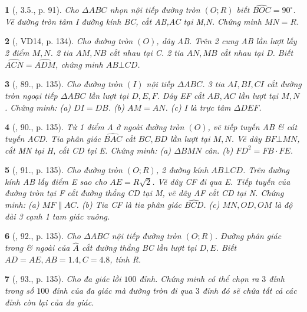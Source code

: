 \documentclass{article}
\newtheorem{baitoan}{}
\begin{document}
\begin{baitoan}[\cite{Binh_boi_duong_Toan_9_tap_2}, 3.5., p. 91]
	Cho $\Delta ABC$ nhọn nội tiếp đường tròn $(O;R)$ biết $\widehat{BOC} = 90^\circ$. Vẽ đường tròn tâm I đường kính BC, cắt AB,AC tại M,N. Chứng minh $MN = R$.
\end{baitoan}

\begin{baitoan}[\cite{Tuyen_Toan_9_old}, VD14, p. 134]
	Cho đường tròn $(O)$, dây AB. Trên 2 cung AB lần lượt lấy 2 điểm $M,N$. 2 tia $AM,NB$ cắt nhau tại C. 2 tia $AN,MB$ cắt nhau tại D. Biết $\widehat{ACN} = \widehat{ADM}$, chứng minh $AB\bot CD$.
\end{baitoan}

\begin{baitoan}[\cite{Tuyen_Toan_9_old}, 89., p. 135]
	Cho đường tròn $(I)$ nội tiếp $\Delta ABC$. 3 tia $AI,BI,CI$ cắt đường tròn ngoại tiếp $\Delta ABC$ lần lượt tại $D,E,F$. Dây EF cắt $AB,AC$ lần lượt tại $M,N$. Chứng minh: (a) $DI = DB$. (b) $AM = AN$. (c) I là trực tâm $\Delta DEF$.
\end{baitoan}

\begin{baitoan}[\cite{Tuyen_Toan_9_old}, 90., p. 135]
	Từ 1 điểm A ở ngoài đường tròn $(O)$, vẽ tiếp tuyến AB \& cát tuyến ACD. Tia phân giác $\widehat{BAC}$ cắt $BC,BD$ lần lượt tại $M,N$. Vẽ dây $BF\bot MN$, cắt MN tại H, cắt CD tại E. Chứng minh: (a) $\Delta BMN$ cân. (b) $FD^2 = FB\cdot FE$.
\end{baitoan}

\begin{baitoan}[\cite{Tuyen_Toan_9_old}, 91., p. 135]
	Cho đường tròn $(O;R)$, 2 đường kính $AB\bot CD$. Trên đường kính AB lấy điểm E sao cho $AE = R\sqrt{2}$. Vẽ dây CF đi qua E. Tiếp tuyến của đường tròn tại F cắt đường thẳng CD tại M, vẽ dây AF cắt CD tại N. Chứng minh: (a) $MF\parallel AC$. (b) Tia CF là tia phân giác $\widehat{BCD}$. (c) $MN,OD,OM$ là độ dài 3 cạnh 1 tam giác vuông.
\end{baitoan}

\begin{baitoan}[\cite{Tuyen_Toan_9_old}, 92., p. 135]
	Cho $\Delta ABC$ nội tiếp đường tròn $(O;R)$. Đường phân giác trong \& ngoài của $\widehat{A}$ cắt đường thẳng BC lần lượt tại $D,E$. Biết $AD = AE,AB = 1.4,C = 4.8$, tính R.
\end{baitoan}

\begin{baitoan}[\cite{Tuyen_Toan_9_old}, 93., p. 135]
	Cho đa giác lồi $100$ đỉnh. Chứng minh có thể chọn ra $3$ đỉnh trong số $100$ đỉnh của đa giác mà đường tròn đi qua $3$ đỉnh đó sẽ chứa tất cả các đỉnh còn lại của đa giác.
\end{baitoan}
\end{document}
